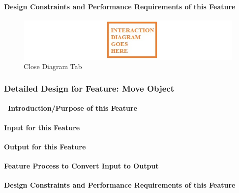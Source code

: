 \documentclass[twoside,letterpaper]{article}
\begin{document}
{{}

\paragraph{Design Constraints and Performance Requirements of this Feature}
{

}
\bigskip

\begin{figure}[h]
\centering
\includegraphics[width=6.0in]{temp.jpg}
\caption{Close Diagram Tab}
\end{figure}

\clearpage



% 
%

\subsubsection{Detailed Design for Feature: Move Object }
\paragraph[\ Introduction/Purpose of this Feature]
{\ Introduction/Purpose of this Feature}
{

}

\paragraph[Input for this Feature]{Input for this Feature}
{

}

\paragraph{Output for this Feature}
{

}

\paragraph{Feature Process to Convert Input to Output}
{

}

\paragraph{Design Constraints and Performance Requirements of this Feature}
{

}}
\end{document}
